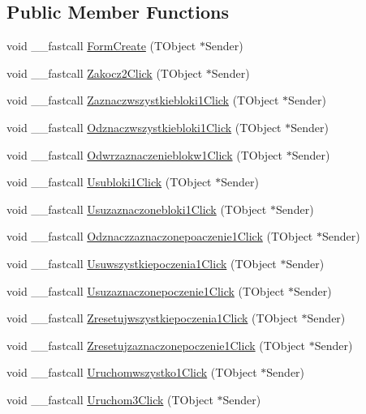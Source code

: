 \subsection*{Public Member Functions}
\begin{CompactItemize}
\item 
void \_\-\_\-fastcall \hyperlink{classTForm1_b28b545fbae8b12c714f4ba8d664e831}{FormCreate} (TObject $\ast$Sender)
\item 
void \_\-\_\-fastcall \hyperlink{classTForm1_21263e28fe98f4d7da87b0f9fb411906}{Zakocz2Click} (TObject $\ast$Sender)
\item 
void \_\-\_\-fastcall \hyperlink{classTForm1_1ea3b1aff58b60bd5338bceb94416ea4}{Zaznaczwszystkiebloki1Click} (TObject $\ast$Sender)
\item 
void \_\-\_\-fastcall \hyperlink{classTForm1_8ddf63f3c72f524fb3e70559d2add67e}{Odznaczwszystkiebloki1Click} (TObject $\ast$Sender)
\item 
void \_\-\_\-fastcall \hyperlink{classTForm1_af1673c47adc3d228f6e6399c76a226d}{Odwrzaznaczenieblokw1Click} (TObject $\ast$Sender)
\item 
void \_\-\_\-fastcall \hyperlink{classTForm1_788905f80f093f21a927242521e0ba78}{Usubloki1Click} (TObject $\ast$Sender)
\item 
void \_\-\_\-fastcall \hyperlink{classTForm1_ec78283bc0f4991e6950955004b60a77}{Usuzaznaczonebloki1Click} (TObject $\ast$Sender)
\item 
void \_\-\_\-fastcall \hyperlink{classTForm1_4e73d3a0fa76a760e8c42b99cb7ca967}{Odznaczzaznaczonepoaczenie1Click} (TObject $\ast$Sender)
\item 
void \_\-\_\-fastcall \hyperlink{classTForm1_fabef0363a8b392dc9bee0438cf334d0}{Usuwszystkiepoczenia1Click} (TObject $\ast$Sender)
\item 
void \_\-\_\-fastcall \hyperlink{classTForm1_87e9a6d2f937b88c477d046b2852109f}{Usuzaznaczonepoczenie1Click} (TObject $\ast$Sender)
\item 
void \_\-\_\-fastcall \hyperlink{classTForm1_013f6ffc037839e3f5251728a89fb168}{Zresetujwszystkiepoczenia1Click} (TObject $\ast$Sender)
\item 
void \_\-\_\-fastcall \hyperlink{classTForm1_6f6d2f51dc3a2e41541c4df797536486}{Zresetujzaznaczonepoczenie1Click} (TObject $\ast$Sender)
\item 
void \_\-\_\-fastcall \hyperlink{classTForm1_979be199e4088eb73e1a199eb11531e0}{Uruchomwszystko1Click} (TObject $\ast$Sender)
\item 
void \_\-\_\-fastcall \hyperlink{classTForm1_12f0a6355c0fe7748f97378e8d83d0e2}{Uruchom3Click} (TObject $\ast$Sender)

\end{CompactItemize}
